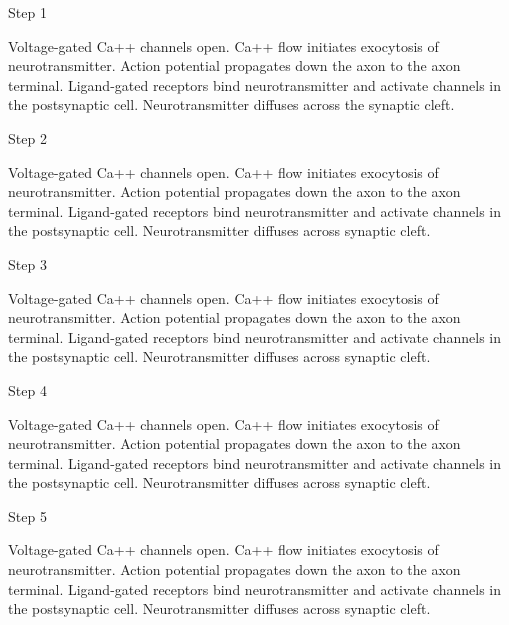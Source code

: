 \documentclass[answers]{exam}
\begin{document}
\begin{questions}

\question Step 1
\begin{choices}
\choice Voltage-gated Ca++ channels open.
\choice Ca++ flow initiates exocytosis of neurotransmitter.
\correctchoice Action potential propagates down the axon to the axon terminal.
\choice Ligand-gated receptors bind neurotransmitter and activate channels in the postsynaptic cell.
\choice Neurotransmitter diffuses across the synaptic cleft.
\end{choices}

\question Step 2
\begin{choices}
\correctchoice Voltage-gated Ca++ channels open.
\choice Ca++ flow initiates exocytosis of neurotransmitter.
\choice Action potential propagates down the axon to the axon terminal.
\choice Ligand-gated receptors bind neurotransmitter and activate channels in the postsynaptic cell.
\choice Neurotransmitter diffuses across synaptic cleft.
\end{choices}

\question Step 3
\begin{choices}
\choice Voltage-gated Ca++ channels open.
\correctchoice Ca++ flow initiates exocytosis of neurotransmitter.
\choice Action potential propagates down the axon to the axon terminal.
\choice Ligand-gated receptors bind neurotransmitter and activate channels in the postsynaptic cell.
\choice Neurotransmitter diffuses across synaptic cleft.
\end{choices}

\question Step 4
\begin{choices}
\choice Voltage-gated Ca++ channels open.
\choice Ca++ flow initiates exocytosis of neurotransmitter.
\choice Action potential propagates down the axon to the axon terminal.
\choice Ligand-gated receptors bind neurotransmitter and activate channels in the postsynaptic cell.
\correctchoice Neurotransmitter diffuses across synaptic cleft.
\end{choices}

\question Step 5
\begin{choices}
\choice Voltage-gated Ca++ channels open.
\choice Ca++ flow initiates exocytosis of neurotransmitter.
\choice Action potential propagates down the axon to the axon terminal.
\correctchoice Ligand-gated receptors bind neurotransmitter and activate channels in the postsynaptic cell.
\choice Neurotransmitter diffuses across synaptic cleft.
\end{choices}


\end{questions}
\end{document}
